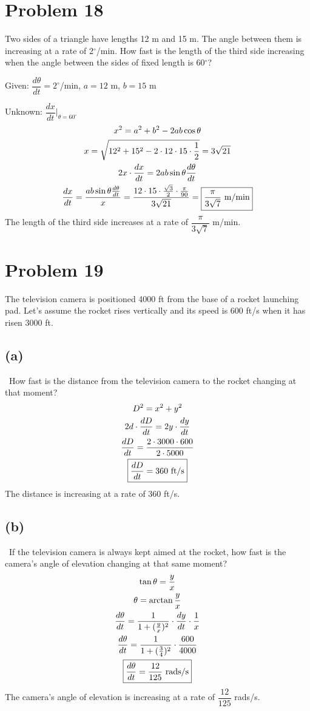 \documentclass[12pt]{article}
\newcommand{\dydt}{\dfrac{dy}{dt}}
\newcommand{\dxdt}{\dfrac{dx}{dt}}
\newcommand{\vem}{\vspace{0.5em}}
\newcommand{\problem}[1]{\section{Problem #1}}
\newcommand{\subproblem}[1]{\subsection{(#1)} \,}
\begin{document}
\problem{18}
Two sides of a triangle have lengths 12 m and 15 m. The angle between them is increasing at a rate of
2$^\circ$/min. How fast is the length of the third side increasing when the angle between the sides of fixed
length is 60$^\circ$? \vem

Given: $\dfrac{d\theta}{dt}=2^\circ$/min, $a=12$ m, $b=15$ m \vem

Unknown: $\dfrac{dx}{dt}\Big|_{\theta = 60^\circ}$
\begin{gather*}
    x^2=a^2+b^2-2ab \cos \theta\\
    x=\sqrt{12^2+15^2-2 \cdot 12\cdot 15\cdot \frac{1}{2}}=3\sqrt{21}\\
    2x\cdot \frac{dx}{dt}= 2ab\sin \theta \frac{d\theta}{dt}\\
    \dxdt=\frac{ab\sin \theta \frac{d\theta}{dt}}{x}=\frac{12\cdot 15\cdot \frac{\sqrt{3}}{2}\cdot\frac{\pi}{90}}{3\sqrt{21}}=\boxed{\frac{\pi}{3\sqrt{7}} $ m/min$}
\end{gather*}
The length of the third side increases at a rate of $\dfrac{\pi}{3\sqrt{7}}$ m/min.

\problem{19}
The television camera is positioned 4000 ft from the base of a rocket launching pad. Let’s assume the
rocket rises vertically and its speed is 600 ft/s when it has risen 3000 ft. \vem

\subproblem{a}
How fast is the distance from the television camera to the rocket changing at that moment?
\begin{gather*}
    D^2=x^2+y^2\\
    2d\cdot \frac{dD}{dt}=2y\cdot \dydt\\
    \frac{dD}{dt}=\frac{2\cdot3000\cdot 600}{2\cdot 5000}\\
    \boxed{\frac{dD}{dt}=360 $ ft/s$}
\end{gather*}
The distance is increasing at a rate of 360 ft/s. \vem

\subproblem{b}
If the television camera is always kept aimed at the rocket, how fast is the camera’s angle of elevation changing at that same moment?
\begin{gather*}
    \tan \theta =\frac{y}{x}\\
    \theta =\arctan \frac{y}{x}\\
    \frac{d\theta}{dt}=\frac{1}{1+(\frac{y}{x})^2}\cdot \dydt \cdot \frac{1}{x}\\
    \frac{d\theta}{dt}=\frac{1}{1+(\frac{3}{4})^2} \cdot \frac{600}{4000}\\
    \boxed{\frac{d\theta}{dt}=\frac{12}{125} $ rads/s$}
\end{gather*}
The camera's angle of elevation is increasing at a rate of $\dfrac{12}{125}$ rads/s.
\end{document}
